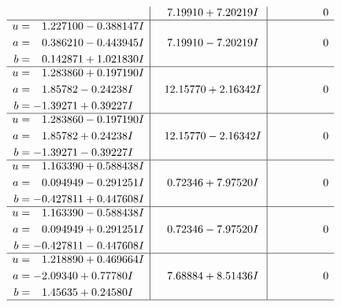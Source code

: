 \documentclass[1p]{elsarticle_modified}
\theoremstyle{definition}
\begin{document}
$$\begin{array}{c|c|c}
 & \phantom{-}7.19910 + 7.20219 I & \phantom{-0.000000 } 0 \\ \hline\begin{aligned}
u &= \phantom{-}1.227100 - 0.388147 I \\
a &= \phantom{-}0.386210 - 0.443945 I \\
b &= \phantom{-}0.142871 + 1.021830 I\end{aligned}
 & \phantom{-}7.19910 - 7.20219 I & \phantom{-0.000000 } 0 \\ \hline\begin{aligned}
u &= \phantom{-}1.283860 + 0.197190 I \\
a &= \phantom{-}1.85782 - 0.24238 I \\
b &= -1.39271 + 0.39227 I\end{aligned}
 & \phantom{-}12.15770 + 2.16342 I & \phantom{-0.000000 } 0 \\ \hline\begin{aligned}
u &= \phantom{-}1.283860 - 0.197190 I \\
a &= \phantom{-}1.85782 + 0.24238 I \\
b &= -1.39271 - 0.39227 I\end{aligned}
 & \phantom{-}12.15770 - 2.16342 I & \phantom{-0.000000 } 0 \\ \hline\begin{aligned}
u &= \phantom{-}1.163390 + 0.588438 I \\
a &= \phantom{-}0.094949 - 0.291251 I \\
b &= -0.427811 + 0.447608 I\end{aligned}
 & \phantom{-}0.72346 + 7.97520 I & \phantom{-0.000000 } 0 \\ \hline\begin{aligned}
u &= \phantom{-}1.163390 - 0.588438 I \\
a &= \phantom{-}0.094949 + 0.291251 I \\
b &= -0.427811 - 0.447608 I\end{aligned}
 & \phantom{-}0.72346 - 7.97520 I & \phantom{-0.000000 } 0 \\ \hline\begin{aligned}
u &= \phantom{-}1.218890 + 0.469664 I \\
a &= -2.09340 + 0.77780 I \\
b &= \phantom{-}1.45635 + 0.24580 I\end{aligned}
 & \phantom{-}7.68884 + 8.51436 I & \phantom{-0.000000 } 0\\
 \hline 
 \end{array}$$\newpage$$\begin{array}{c|c|c}  

\end{array}$$
\end{document}
